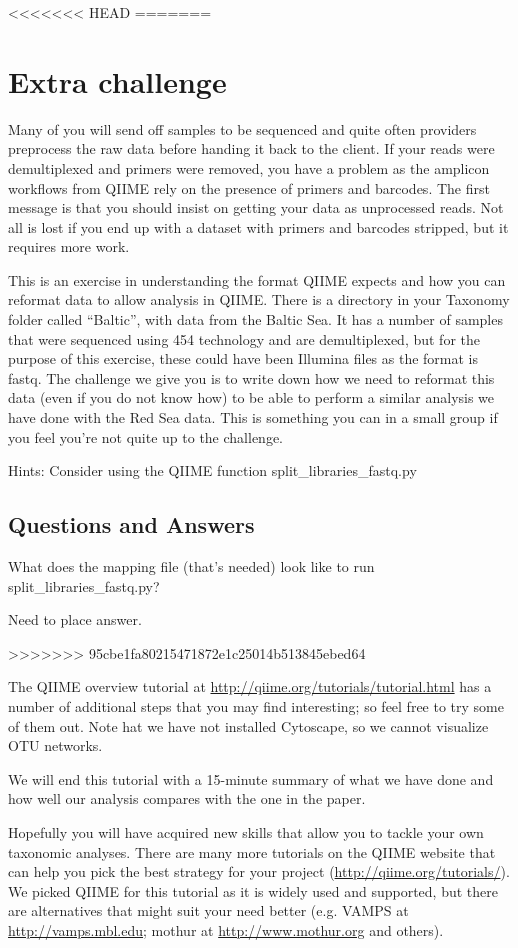 <<<<<<< HEAD
=======
\section{Extra challenge}

Many of you will send off samples to be sequenced and quite often providers preprocess the raw data before handing it back to the client. If your reads were demultiplexed and primers were removed, you have a problem as the amplicon workflows from QIIME rely on the presence of primers and barcodes. The first message is that you should insist on getting your data as unprocessed reads. Not all is lost if you end up with a dataset with primers and barcodes stripped, but it requires more work.

This is an exercise in understanding the format QIIME expects and how you can reformat data to allow analysis in QIIME.
There is a directory in your Taxonomy folder called “Baltic”, with data from the Baltic Sea. It has a number of samples that were sequenced using 454 technology and are demultiplexed, but for the purpose of this exercise, these could have been Illumina files as the format is fastq. 
The challenge we give you is to write down how we need to reformat this data (even if you do not know how) to be able to perform a similar analysis we have done with the Red Sea data. This is something you can in a small group if you feel you're not quite up to the challenge. 

Hints:
Consider using the QIIME function split\_libraries\_fastq.py

\subsection{Questions and Answers}
\begin{questions}
What does the mapping file (that's needed) look like to run split\_libraries\_fastq.py? 
\begin{answer}
Need to place answer.
\end{answer}

\end{questions}
>>>>>>> 95cbe1fa80215471872e1c25014b513845ebed64

The QIIME overview tutorial at \url{http://qiime.org/tutorials/tutorial.html} has a number of additional steps that you may find interesting; so feel free to try some of them out. Note hat we have not installed Cytoscape, so we cannot visualize OTU networks.

We will end this tutorial with a 15-minute summary of what we have done and how well our analysis compares with the one in the paper.

Hopefully you will have acquired new skills that allow you to tackle your own taxonomic analyses. There are many more tutorials on the QIIME website that can help you pick the best strategy for your project (\url{http://qiime.org/tutorials/}). We picked QIIME for this tutorial as it is widely used and supported, but there are alternatives that might suit your need better (e.g. VAMPS at \url{http://vamps.mbl.edu}; mothur at \url{http://www.mothur.org} and others).
